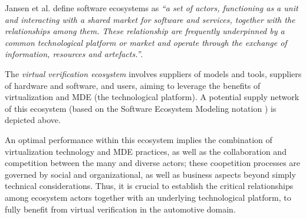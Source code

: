 \small
Jansen et al. \cite{Jansen2009} define software ecosystems as \emph{``a set of actors, functioning as a unit and interacting with a shared market for software and services, together with the relationships among them. These relationship are frequently underpinned by a common technological platform or market and operate through the exchange of information, resources and artefacts.''}.


The \emph{virtual verification ecosystem}
 \cite{Knauss2014d} involves suppliers of models and tools, suppliers of hardware and software, and users, aiming to leverage the benefits of virtualization and MDE (the technological platform).
A potential supply network of this ecosystem (based on the Software Ecosystem Modeling notation \cite{Boucharas2009}) is depicted above.

An optimal performance within this ecosystem implies the combination of virtualization technology and MDE practices, as well as the collaboration and competition between the many and diverse actors; these coopetition processes are governed by social and organizational, as well as business aspects beyond simply technical considerations.
%
%
%
Thus, it is crucial to establish the critical relationships among ecosystem actors together with an underlying technological platform, to fully benefit from virtual verification in the automotive domain.

